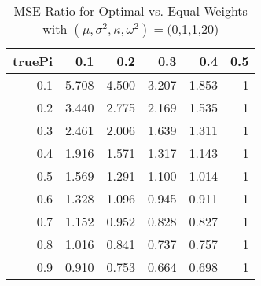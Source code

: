 \begin{table}

\caption{\label{tab:}MSE Ratio for Optimal vs. Equal Weights with $(\mu, \sigma^2, \kappa, \omega^2) = ($0,1,1,20)}
\centering
\begin{tabular}[t]{rrrrrr}
\toprule
truePi & 0.1 & 0.2 & 0.3 & 0.4 & 0.5\\
\midrule
0.1 & 5.708 & 4.500 & 3.207 & 1.853 & 1\\
0.2 & 3.440 & 2.775 & 2.169 & 1.535 & 1\\
0.3 & 2.461 & 2.006 & 1.639 & 1.311 & 1\\
0.4 & 1.916 & 1.571 & 1.317 & 1.143 & 1\\
0.5 & 1.569 & 1.291 & 1.100 & 1.014 & 1\\
0.6 & 1.328 & 1.096 & 0.945 & 0.911 & 1\\
0.7 & 1.152 & 0.952 & 0.828 & 0.827 & 1\\
0.8 & 1.016 & 0.841 & 0.737 & 0.757 & 1\\
0.9 & 0.910 & 0.753 & 0.664 & 0.698 & 1\\
\bottomrule
\end{tabular}
\end{table}
